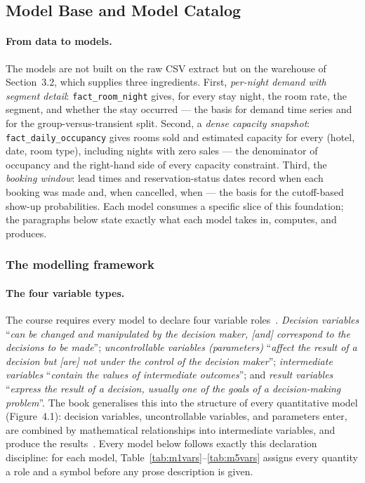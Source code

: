 \subsection{Model Base and Model Catalog}

\paragraph{From data to models.}
The models are not built on the raw CSV extract but on the warehouse of Section~3.2, which supplies three ingredients. First, \emph{per-night demand with segment detail}: \texttt{fact\_room\_night} gives, for every stay night, the room rate, the segment, and whether the stay occurred --- the basis for demand time series and for the group-versus-transient split. Second, a \emph{dense capacity snapshot}: \texttt{fact\_daily\_occupancy} gives rooms sold and estimated capacity for every (hotel, date, room type), including nights with zero sales --- the denominator of occupancy and the right-hand side of every capacity constraint. Third, the \emph{booking window}: lead times and reservation-status dates record when each booking was made and, when cancelled, when --- the basis for the cutoff-based show-up probabilities. Each model consumes a specific slice of this foundation; the paragraphs below state exactly what each model takes in, computes, and produces.

\subsubsection{The modelling framework}

\paragraph{The four variable types.}
The course requires every model to declare four variable roles~\cite{turban2011}. \emph{Decision variables} ``\emph{can be changed and manipulated by the decision maker, [and] correspond to the decisions to be made}''; \emph{uncontrollable variables (parameters)} ``\emph{affect the result of a decision but [are] not under the control of the decision maker}''; \emph{intermediate variables} ``\emph{contain the values of intermediate outcomes}''; and \emph{result variables} ``\emph{express the result of a decision, usually one of the goals of a decision-making problem}''. The book generalises this into the structure of every quantitative model (Figure~4.1): decision variables, uncontrollable variables, and parameters enter, are combined by mathematical relationships into intermediate variables, and produce the results~\cite{turban2011}. Every model below follows exactly this declaration discipline: for each model, Table~\ref{tab:m1vars}--\ref{tab:m5vars} assigns every quantity a role and a symbol before any prose description is given.

